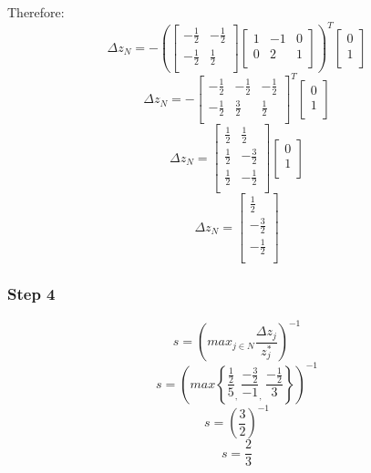 \documentclass[14pt]{extarticle}
\begin{document}
\bigskip Therefore:
\[
    \Delta z_N = -\left(\begin{bmatrix}
        -\frac{1}{2} & -\frac{1}{2} \\
        -\frac{1}{2} & \frac{1}{2} \\
    \end{bmatrix}
    \begin{bmatrix}
        1 & -1 & 0 \\
        0 & 2 & 1 \\
    \end{bmatrix}\right)^T
    \begin{bmatrix}
        0 \\
        1 \\
    \end{bmatrix}
\]
\[
    \Delta z_N = -\begin{bmatrix}
        -\frac{1}{2} & -\frac{1}{2} & -\frac{1}{2} \\
        -\frac{1}{2} & \frac{3}{2} & \frac{1}{2} \\
    \end{bmatrix}^T
    \begin{bmatrix}
        0 \\
        1 \\
    \end{bmatrix}
\]
\[
    \Delta z_N = \begin{bmatrix}
        \frac{1}{2} & \frac{1}{2} \\
        \frac{1}{2} & -\frac{3}{2} \\
        \frac{1}{2} & -\frac{1}{2} \\
    \end{bmatrix}
    \begin{bmatrix}
        0 \\
        1 \\
    \end{bmatrix}
\]
\[
    \Delta z_N = \begin{bmatrix}
        \frac{1}{2} \\
        -\frac{3}{2} \\
        -\frac{1}{2} \\
    \end{bmatrix}
\]

\subsubsection*{Step 4}
\[
    s = \left(max_{j \in N} \frac{\Delta z_j}{z^*_j}\right)^{-1}
\]
\[
    s = \left(max \left\{ \frac{\frac{1}{2}}{5}_{\textstyle,}\ \frac{-\frac{3}{2}}{-1}_{\textstyle,}\ \frac{-\frac{1}{2}}{3} \right\} \right)^{-1}
\]
\[
    s = \left(\frac{3}{2}\right)^{-1}
\]
\[
    s = \frac{2}{3}
\]
\end{document}
